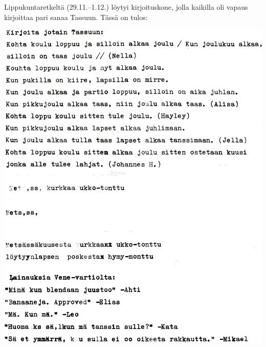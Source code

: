 \clearpage
\noindent Lippukuntaretkeltä (29.11.--1.12.) löytyi kirjoituskone, jolla kaikilla oli vapaus
kirjoittaa pari sanaa Tassuun. Tässä on tulos:

\vspace*{1.5cm}
\noindent\includegraphics[width=\linewidth]{assets/pikkujoulu2}
